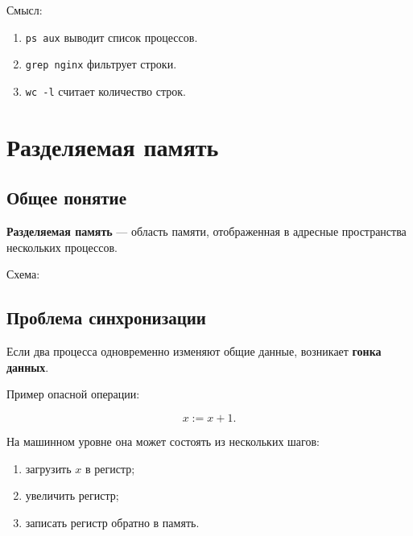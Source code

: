 \documentclass[12pt,a4paper]{article}
\begin{document}
Смысл:
\begin{enumerate}
    \item \texttt{ps aux} выводит список процессов.
    \item \texttt{grep nginx} фильтрует строки.
    \item \texttt{wc -l} считает количество строк.
\end{enumerate}

\section{Разделяемая память}

\subsection{Общее понятие}

\textbf{Разделяемая память} --- область памяти, отображенная в адресные пространства нескольких процессов.

Схема:

\begin{center}
\end{center}

\subsection{Проблема синхронизации}

Если два процесса одновременно изменяют общие данные, возникает \textbf{гонка данных}.

Пример опасной операции:

\[
    x := x + 1.
\]

На машинном уровне она может состоять из нескольких шагов:

\begin{enumerate}
    \item загрузить $x$ в регистр;
    \item увеличить регистр;
    \item записать регистр обратно в память.
\end{enumerate}
\end{document}

